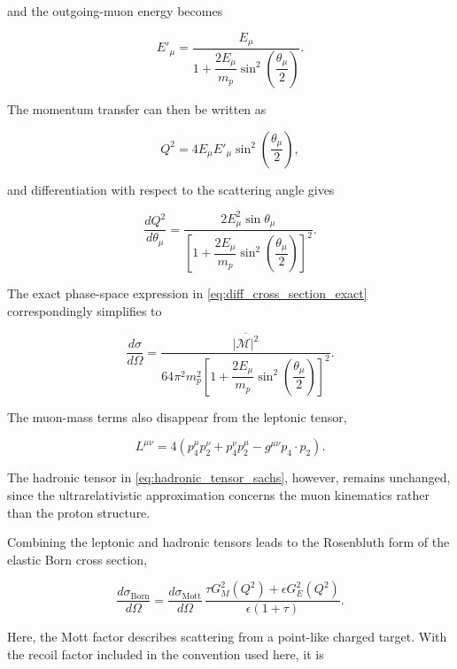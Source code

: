 and the outgoing-muon energy becomes

\begin{equation}
E'_\mu
=
\frac{E_\mu}
{
1+\dfrac{2E_\mu}{m_p}
\sin^2\left(\dfrac{\theta_\mu}{2}\right)
}.
\label{eq:Eprime_ultrarel}
\end{equation}

The momentum transfer can then be written as

\[
Q^2
=
4E_\mu E'_\mu
\sin^2\left(\frac{\theta_\mu}{2}\right),
\]

and differentiation with respect to the scattering angle gives

\begin{equation}
\frac{dQ^2}{d\theta_\mu}
=
\frac{
2E_\mu^2\sin\theta_\mu
}{
\left[
1+\dfrac{2E_\mu}{m_p}
\sin^2\left(\dfrac{\theta_\mu}{2}\right)
\right]^2
}.
\label{eq:dQ2_dtheta_ultrarel}
\end{equation}

The exact phase-space expression in \autoref{eq:diff_cross_section_exact} correspondingly simplifies to

\begin{equation}
\frac{d\sigma}{d\Omega}
=
\frac{
\overline{|\mathcal{M}|^2}
}{
64\pi^2m_p^2
\left[
1+\dfrac{2E_\mu}{m_p}
\sin^2\left(\dfrac{\theta_\mu}{2}\right)
\right]^2
}.
\label{eq:diff_cross_section_ultrarel}
\end{equation}

The muon-mass terms also disappear from the leptonic tensor,

\[
L^{\mu\nu}
=
4
\left(
p_4^\mu p_2^\nu
+
p_4^\nu p_2^\mu
-
g^{\mu\nu}p_4\cdot p_2
\right).
\]

The hadronic tensor in \autoref{eq:hadronic_tensor_sachs}, however, remains unchanged, since the ultrarelativistic approximation concerns the muon kinematics rather than the proton structure.

Combining the leptonic and hadronic tensors leads to the Rosenbluth form of the elastic Born cross section,

\begin{equation}
\frac{d\sigma_{\mathrm{Born}}}{d\Omega}
=
\frac{d\sigma_{\mathrm{Mott}}}{d\Omega}
\,
\frac{
\tau G_M^2(Q^2)
+
\epsilon G_E^2(Q^2)
}{
\epsilon(1+\tau)
}.
\label{eq:rosenbluth}
\end{equation}

Here, the Mott factor describes scattering from a point-like charged target. With the recoil factor included in the convention used here, it is

